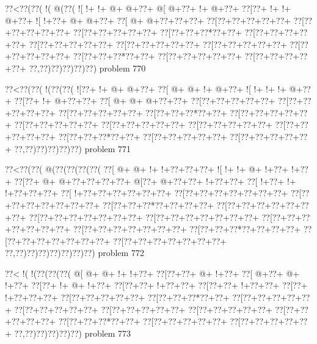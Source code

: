 \vbox{\vbox{\goo
\0??<\0??(\0??(\- !(\- @(\0??(
\- ![\- !+\- !+\- @+\- @+\0??+
\- @[\- @+\0??+\- !+\- @+\0??+
\0??[\0??+\- !+\- !+\- @+\0??+
\- ![\- !+\0??+\- @+\- @+\0??+
\0??[\- @+\- @+\0??+\0??+\0??+
\0??[\0??+\0??+\0??+\0??+\0??+
\0??[\0??+\0??+\0??+\0??+\0??+
\0??[\0??+\0??+\0??+\0??+\0??+
\0??[\0??+\0??+\0??*\0??+\0??+
\0??[\0??+\0??+\0??+\0??+\0??+
\0??[\0??+\0??+\0??+\0??+\0??+
\0??[\0??+\0??+\0??+\0??+\0??+
\0??[\0??+\0??+\0??+\0??+\0??+
\0??[\0??+\0??+\0??+\0??+\0??+
\0??[\0??+\0??+\0??*\0??+\0??+
\0??[\0??+\0??+\0??+\0??+\0??+
\0??[\0??+\0??+\0??+\0??+\0??+
\0??,\0??)\0??)\0??)\0??)\0??)
}
\hfil problem 770\hfil\break
}

\vbox{\vbox{\goo
\0??<\0??(\0??(\- !(\0??(\0??(
\- ![\0??+\- !+\- @+\- @+\0??+
\0??[\- @+\- @+\- !+\- @+\0??+
\- ![\- !+\- !+\- !+\- @+\0??+
\0??[\0??+\- !+\- @+\0??+\0??+
\0??[\- @+\- @+\- @+\0??+\0??+
\0??[\0??+\0??+\0??+\0??+\0??+
\0??[\0??+\0??+\0??+\0??+\0??+
\0??[\0??+\0??+\0??+\0??+\0??+
\0??[\0??+\0??+\0??*\0??+\0??+
\0??[\0??+\0??+\0??+\0??+\0??+
\0??[\0??+\0??+\0??+\0??+\0??+
\0??[\0??+\0??+\0??+\0??+\0??+
\0??[\0??+\0??+\0??+\0??+\0??+
\0??[\0??+\0??+\0??+\0??+\0??+
\0??[\0??+\0??+\0??*\0??+\0??+
\0??[\0??+\0??+\0??+\0??+\0??+
\0??[\0??+\0??+\0??+\0??+\0??+
\0??,\0??)\0??)\0??)\0??)\0??)
}
\hfil problem 771\hfil\break
}

\vbox{\vbox{\goo
\0??<\0??(\0??(\- @(\0??(\0??(\0??(\0??(
\0??[\- @+\- @+\- !+\- !+\0??+\0??+\0??+
\- ![\- !+\- !+\- @+\- !+\0??+\- !+\0??+
\0??[\0??+\- @+\- @+\0??+\0??+\0??+\0??+
\- @[\0??+\- @+\0??+\0??+\- !+\0??+\0??+
\0??[\- !+\0??+\- !+\- !+\0??+\0??+\0??+
\0??[\- !+\0??+\0??+\0??+\0??+\0??+\0??+
\0??[\0??+\0??+\0??+\0??+\0??+\0??+\0??+
\0??[\0??+\0??+\0??+\0??+\0??+\0??+\0??+
\0??[\0??+\0??+\0??*\0??+\0??+\0??+\0??+
\0??[\0??+\0??+\0??+\0??+\0??+\0??+\0??+
\0??[\0??+\0??+\0??+\0??+\0??+\0??+\0??+
\0??[\0??+\0??+\0??+\0??+\0??+\0??+\0??+
\0??[\0??+\0??+\0??+\0??+\0??+\0??+\0??+
\0??[\0??+\0??+\0??+\0??+\0??+\0??+\0??+
\0??[\0??+\0??+\0??*\0??+\0??+\0??+\0??+
\0??[\0??+\0??+\0??+\0??+\0??+\0??+\0??+
\0??[\0??+\0??+\0??+\0??+\0??+\0??+\0??+
\0??,\0??)\0??)\0??)\0??)\0??)\0??)\0??)
}
\hfil problem 772\hfil\break
}

\vbox{\vbox{\goo
\0??<\- !(\- !(\0??(\0??(\0??(
\- @[\- @+\- @+\- !+\- !+\0??+
\0??[\0??+\0??+\- @+\- !+\0??+
\0??[\- @+\0??+\- @+\- !+\0??+
\0??[\0??+\- !+\- @+\- !+\0??+
\0??[\0??+\0??+\- !+\0??+\0??+
\0??[\0??+\0??+\- !+\0??+\0??+
\0??[\0??+\- !+\0??+\0??+\0??+
\0??[\0??+\0??+\0??+\0??+\0??+
\0??[\0??+\0??+\0??*\0??+\0??+
\0??[\0??+\0??+\0??+\0??+\0??+
\0??[\0??+\0??+\0??+\0??+\0??+
\0??[\0??+\0??+\0??+\0??+\0??+
\0??[\0??+\0??+\0??+\0??+\0??+
\0??[\0??+\0??+\0??+\0??+\0??+
\0??[\0??+\0??+\0??*\0??+\0??+
\0??[\0??+\0??+\0??+\0??+\0??+
\0??[\0??+\0??+\0??+\0??+\0??+
\0??,\0??)\0??)\0??)\0??)\0??)
}
\hfil problem 773\hfil\break
}

